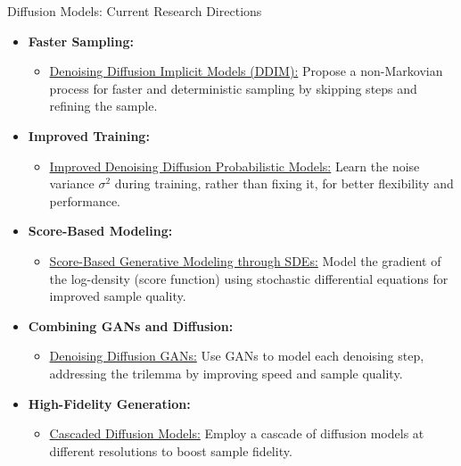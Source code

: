 \begin{frame}[allowframebreaks]{Diffusion Models: Current Research Directions}
\begin{itemize}
    \item \textbf{Faster Sampling:}
    \begin{itemize}
        \item \href{https://arxiv.org/abs/2010.02502}{Denoising Diffusion Implicit Models (DDIM):} 
        Propose a non-Markovian process for faster and deterministic sampling by skipping steps and refining the sample.
    \end{itemize}
    \item \textbf{Improved Training:}
    \begin{itemize}
        \item \href{https://arxiv.org/abs/2102.09672}{Improved Denoising Diffusion Probabilistic Models:}
        Learn the noise variance $\sigma^2$ during training, rather than fixing it, for better flexibility and performance.
    \end{itemize}
    \item \textbf{Score-Based Modeling:}
    \begin{itemize}
        \item \href{https://arxiv.org/abs/2011.13456}{Score-Based Generative Modeling through SDEs:}
        Model the gradient of the log-density (score function) using stochastic differential equations for improved sample quality.
    \end{itemize}
\framebreak
    \item \textbf{Combining GANs and Diffusion:}
    \begin{itemize}
        \item \href{https://arxiv.org/abs/2112.07804}{Denoising Diffusion GANs:}
        Use GANs to model each denoising step, addressing the trilemma by improving speed and sample quality.
    \end{itemize}
    \item \textbf{High-Fidelity Generation:}
    \begin{itemize}
        \item \href{https://arxiv.org/abs/2106.15282}{Cascaded Diffusion Models:}
        Employ a cascade of diffusion models at different resolutions to boost sample fidelity.
    \end{itemize}
\end{itemize}
\end{frame}
